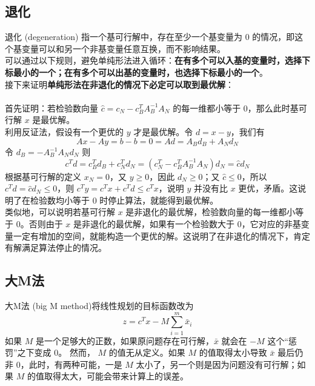 \subsection{退化}
退化 (degeneration) 指一个基可行解中，存在至少一个基变量为 $0$ 的情况，即这个基变量可以和另一个非基变量任意互换，而不影响结果。 \\
可以通过以下规则，避免单纯形法进入循环：\textbf{在有多个可以入基的变量时，选择下标最小的一个；在有多个可以出基的变量时，也选择下标最小的一个}。 \\
接下来证明\textbf{单纯形法在非退化的情况下必定可以取到最优解}： \\~\\
首先证明：若检验数向量 $\hat{c} = c_N - c_B^TA_B^{-1}A_N$ 的每一维都小等于 $0$，那么此时基可行解 $x$ 是最优解。 \\
利用反证法，假设有一个更优的 $y$ 才是最优解。令 $d = x - y$，我们有 
$$
Ax - Ay = b - b = 0 = Ad = A_Bd_B + A_Nd_N
$$
令 $d_B = -A_B^{-1}A_Nd_N$ 则
$$
c^Td = c_B^Td_B + c_N^Td_N = (c_N^T-c_B^TA_B^{-1}A_N)d_N = \hat{c}d_N
$$
根据基可行解的定义 $x_N = 0$，又 $y \ge 0$，因此 $d_N \ge 0$；又 $\hat{c} \le 0$，所以 $c^Td = \hat{c}d_N \le 0$，则 $c^Ty = c^Tx + c^Td \le c^Tx$，说明 $y$ 并没有比 $x$ 更优，矛盾。这说明了在检验数均小等于 $0$ 时停止算法，就能得到最优解。 \\
类似地，可以说明若基可行解 $x$ 是非退化的最优解，检验数向量的每一维都小等于 $0$。否则由于 $x$ 是非退化的最优解，如果有一个检验数大于 $0$，它对应的非基变量一定有增加的空间，就能构造一个更优的解。这说明了在非退化的情况下，肯定有解满足算法停止的情况。

\subsection{大M法}
大M法 (big M method)将线性规划的目标函数改为
$$
z = c^Tx - M\sum_{i=1}^m\bar{x}_i
$$
如果 $M$ 是一个足够大的正数，如果原问题存在可行解，$\bar{x}$ 就会在 $-M$ 这个“惩罚”之下变成 $0$。
然而， $M$ 的值无从定义。如果 $M$ 的值取得太小导致 $\bar{x}$ 最后仍非 $0$，此时，有两种可能，一是 $M$ 太小了，另一个则是因为问题没有可行解；如果 $M$ 的值取得太大，可能会带来计算上的误差。

